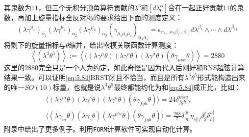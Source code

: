 其鬼数为$11$，但三个无积分顶角算符贡献的$\lambda^3$和$[d\lambda_0^\alpha]$合在一起正好贡献$11$的鬼数，再加上旋量指标全反对称的要求给出下面的测度定义：
\begin{equation}
	[d\lambda^\alpha](\lambda\gamma^{\mu_1})_{\alpha_1}(\lambda\gamma^{\mu_2})_{\alpha_2}(\lambda\gamma^{\mu_3})_{\alpha_3}(\gamma_{\mu_1\mu_2\mu_3})_{\alpha_4\alpha_5}=\epsilon_{\alpha_1...\alpha_5\beta_1...\beta_{11}}d\lambda^{\beta_1}\wedge\cdots\wedge d\lambda^{\beta_{11}}
\end{equation}
将剩下的旋量指标与$\theta$缩并，给出零模关联函数计算测度：
\begin{equation}
	\label{eq:5.84}
	\boxed{
	\left\langle(\lambda^3\theta^5)\right\rangle:=\left\langle((\lambda\gamma^\mu\theta)(\lambda\gamma^\nu\theta)(\lambda\gamma^\sigma\theta)(\theta\gamma_{\mu\nu\sigma}\theta)\right\rangle = 2880
	}
\end{equation}
这里的$2880$完全只是一个人为约定，如此奇怪是因为代入后刚好和RNS超弦计算结果一致。可以证明\ref{eq:5.84}BRST闭且不恰当，而且是所有$\lambda^3\theta^5$形式能构造出来的唯一$SO(10)$标量，也就是说$\lambda^3\theta^5$最终都能约化为和\ref{eq:5.84}成正比，比如：
\begin{equation}
	\label{eq:5.85}
	\begin{aligned}
		&\langle(\lambda\gamma^m\theta)(\lambda\gamma^s\theta)(\lambda\gamma^u\theta)(\theta\gamma_{fgh}\theta)\rangle=24\delta_{fgh}^{msu},\\&\langle(\lambda\gamma_m\theta)(\lambda\gamma_s\theta)(\lambda\gamma^{ptu}\theta)(\theta\gamma_{fgh}\theta)\rangle=\frac{288}{7}\delta_{[m}^{[p}\eta_{s][f}\delta_g^t\delta_{h]}^{u]}
	\end{aligned}
\end{equation}
附录中给出了更多例子。利用\texttt{FORM}计算软件可实现自动化计算。\cite{Mafra:2010pn}

